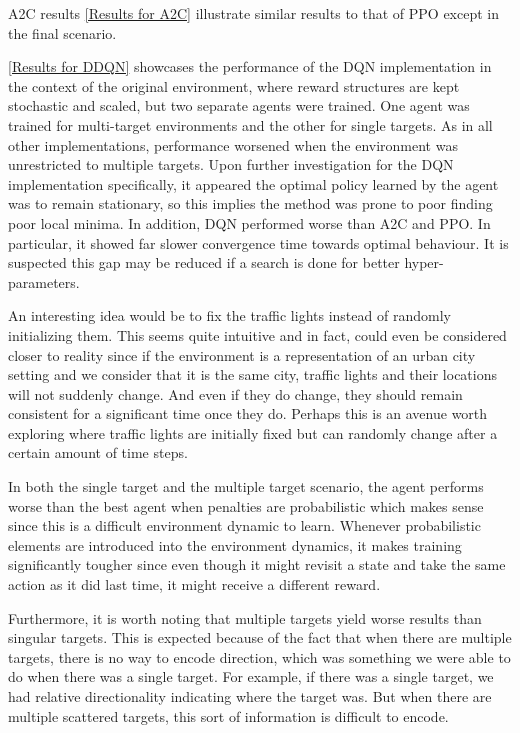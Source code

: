 \documentclass{article}
\begin{document}
	A2C results \ref{Results for A2C} illustrate similar results to that of PPO except in the final scenario. 
		
	\ref{Results for DDQN} showcases the performance of the DQN implementation in the context of the original environment, where reward structures are kept stochastic and scaled, but two separate agents were trained. One agent was trained for multi-target environments and the other for single targets. As in all other implementations, performance worsened when the environment was unrestricted to multiple targets. Upon further investigation for the DQN implementation specifically, it appeared the optimal policy learned by the agent was to remain stationary, so this implies the method was prone to poor finding poor local minima. In addition, DQN performed worse than A2C and PPO. In particular, it showed far slower convergence time towards optimal behaviour. It is suspected this gap may be reduced if a search is done for better hyper-parameters.
	
	An interesting idea would be to fix the traffic lights instead of randomly initializing them. This seems quite intuitive and in fact, could even be considered closer to reality since if the environment is a representation of an urban city setting and we consider that it is the same city, traffic lights and their locations will not suddenly change. And even if they do change, they should remain consistent for a significant time once they do. Perhaps this is an avenue worth exploring where traffic lights are initially fixed but can randomly change after a certain amount of time steps. 
	
	In both the single target and the multiple target scenario, the agent performs worse than the best agent when penalties are probabilistic which makes sense since this is a difficult environment dynamic to learn. Whenever probabilistic elements are introduced into the environment dynamics, it makes training significantly tougher since even though it might revisit a state and take the same action as it did last time, it might receive a different reward.
	
	Furthermore, it is worth noting that multiple targets yield worse results than singular targets. This is expected because of the fact that when there are multiple targets, there is no way to encode direction, which was something we were able to do when there was a single target. For example, if there was a single target, we had relative directionality indicating where the target was. But when there are multiple scattered targets, this sort of information is difficult to encode. 
	
\end{document}
